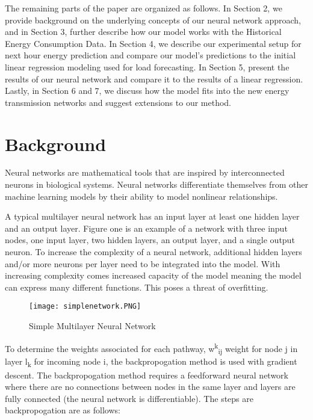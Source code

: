 \documentclass[twoside,11pt]{article}
\begin{document}
The remaining parts of the paper are organized as follows. In Section 2, we provide background on the underlying concepts of our neural network approach, and in Section 3, further describe how our model works with the Historical Energy Consumption Data. In Section 4, we describe our experimental setup for next hour energy prediction and compare our model's predictions to the initial linear regression modeling used for load forecasting. In Section 5, present the results of our neural network and compare it to the results of a linear regression. Lastly, in Section 6 and 7, we discuss how the model fits into the new energy transmission networks and suggest extensions to our method. 

\section{Background} \label{background}

\indent Neural networks are mathematical tools that are inspired by interconnected neurons in biological systems. Neural networks differentiate themselves from other machine learning models by their ability to model nonlinear relationships.

A typical multilayer neural network has an input layer at least one hidden layer and an output layer. Figure one is an example of a network with three input nodes, one input layer, two hidden layers, an output layer, and a single output neuron. To increase the complexity of a neural network, additional hidden layers and/or more neurons per layer need to be integrated into the model. With increasing complexity comes increased capacity of the model meaning the model can express many different functions. This poses a threat of overfitting.

\begin{figure}[!htbp]
  \centering 
  \texttt{[image: simplenetwork.PNG]} 
  \caption{Simple Multilayer Neural Network}
  \label{fig:example}
\end{figure}

To determine the weights associated for each pathway, w\textsuperscript{k}\textsubscript{ij} weight for node j in layer l\textsubscript{k} for incoming node i, the backpropogation method is used with gradient descent. The backpropogation method requires a feedforward neural network where there are no connections between nodes in the same layer and layers are fully connected (the neural network is differentiable). The steps are backpropogation are as follows: 
\end{document}
